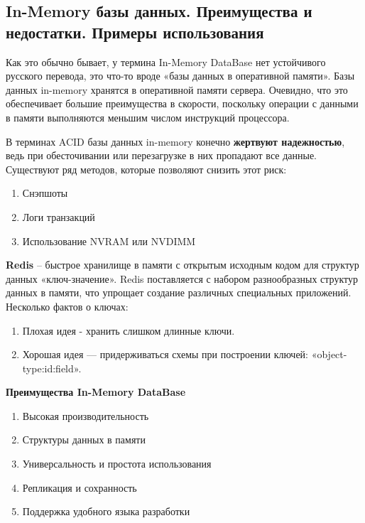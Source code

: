 \newpage

\subsection{In-Memory базы данных. Преимущества и недостатки. Примеры использования}

Как это обычно бывает, у термина In-Memory DataBase нет устойчивого
русского
перевода, это что-то вроде «базы данных в оперативной памяти».
Базы данных in-memory хранятся в оперативной памяти сервера.
Очевидно, что это
обеспечивает большие преимущества в скорости, поскольку операции с
данными в
памяти выполняются меньшим числом инструкций процессора.

В терминах ACID базы данных in-memory конечно \textbf{жертвуют надежностью},
ведь при
обесточивании или перезагрузке в них пропадают все данные.
Существуют ряд методов, которые позволяют снизить этот риск:

\begin{enumerate}
	\item Снэпшоты
	\item Логи транзакций
	\item Использование NVRAM или NVDIMM
\end{enumerate}

\textbf{Redis} – быстрое хранилище в памяти с открытым исходным кодом для
структур данных
«ключ-значение». Redis поставляется с набором разнообразных структур
данных в
памяти, что упрощает создание различных специальных приложений.
Несколько фактов о ключах:
 
\begin{enumerate}
	\item Плохая идея - хранить слишком длинные ключи.
	\item Хорошая идея — придерживаться схемы при построении ключей:
	«object-type:id:field».
\end{enumerate}

\textbf{Преимущества In-Memory DataBase}

\begin{enumerate}
	\item Высокая производительность
	\item Структуры данных в памяти
	\item Универсальность и простота использования
	\item Репликация и сохранность
	\item Поддержка удобного языка разработки
\end{enumerate}

